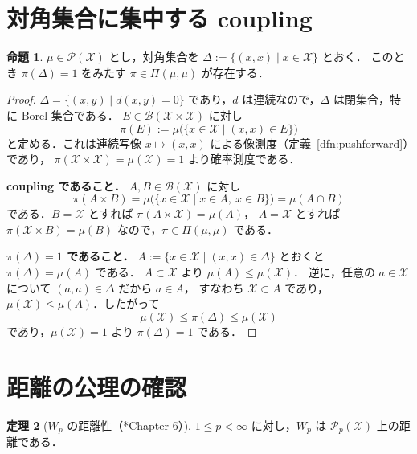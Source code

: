 \documentclass[12pt,a4j,twoside]{jreport}
\numberwithin{equation}{chapter}
\theoremstyle{definition} %
\newtheorem{thm}{定理}[chapter]
\newtheorem{prop}[thm]{命題}
\newcommand{\X}{\mathcal{X}}
\newcommand{\Borel}{\mathcal{B}}
\newcommand{\Prob}{\mathcal{P}}
\newcommand{\Pp}[1]{\mathcal{P}_{#1}}
\newcommand{\Couplings}{\Pi}
\newcommand{\Wass}{W}
\begin{document}
\section{対角集合に集中する coupling}

\begin{prop}\label{prop:diagonal}
  $\mu\in\Prob(\X)$ とし，対角集合を $\Delta:=\{(x,x)\mid x\in\X\}$ とおく．
  このとき $\pi(\Delta)=1$ をみたす $\pi\in\Couplings(\mu,\mu)$ が存在する．
\end{prop}

\begin{proof}
  $\Delta=\{(x,y)\mid d(x,y)=0\}$ であり，$d$ は連続なので，$\Delta$ は閉集合，特に Borel 集合である．
  $E\in\Borel(\X\times\X)$ に対し
  \[
    \pi(E):=\mu\bigl(\{x\in\X\mid(x,x)\in E\}\bigr)
  \]
  と定める．これは連続写像 $x\mapsto(x,x)$ による像測度（定義~\ref{dfn:pushforward}）であり，
  $\pi(\X\times\X)=\mu(\X)=1$ より確率測度である．

  \textbf{coupling であること．}
  $A,B\in\Borel(\X)$ に対し
  \[
    \pi(A\times B)=\mu\bigl(\{x\in\X\mid x\in A,\ x\in B\}\bigr)=\mu(A\cap B)
  \]
  である．$B=\X$ とすれば $\pi(A\times\X)=\mu(A)$，
  $A=\X$ とすれば $\pi(\X\times B)=\mu(B)$ なので，$\pi\in\Couplings(\mu,\mu)$ である．

  \textbf{$\pi(\Delta)=1$ であること．}
  $A:=\{x\in\X\mid(x,x)\in\Delta\}$ とおくと $\pi(\Delta)=\mu(A)$ である．
  $A\subset\X$ より $\mu(A)\leq\mu(\X)$．
  逆に，任意の $a\in\X$ について $(a,a)\in\Delta$ だから $a\in A$，
  すなわち $\X\subset A$ であり，$\mu(\X)\leq\mu(A)$．したがって
  \[
    \mu(\X)\leq\pi(\Delta)\leq\mu(\X)
  \]
  であり，$\mu(\X)=1$ より $\pi(\Delta)=1$ である．
\end{proof}

\section{距離の公理の確認}

\begin{thm}[$\Wass_p$ の距離性（\cite{Villani}*{Chapter 6}）]\label{thm:wp-metric}
  $1\leq p<\infty$ に対し，$\Wass_p$ は $\Pp{p}(\X)$ 上の距離である．
\end{thm}
\end{document}
